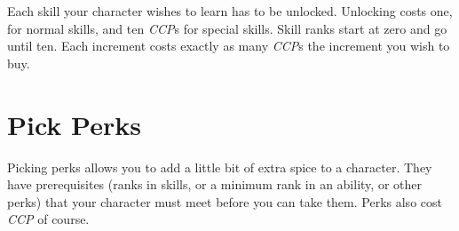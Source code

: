 Each skill your character wishes to learn has to be unlocked. Unlocking costs
one, for normal skills, and ten \emph{CCP}s for special skills. Skill ranks
start at zero and go until ten. Each increment costs exactly as many
\emph{CCP}s the increment you wish to buy.

\section{Pick Perks}
\label{sec:3-Pick Perks}

Picking perks allows you to add a little bit of extra spice to a character.
They have prerequisites (ranks in skills, or a minimum rank in an ability,
or other perks) that your character must meet before you can take them.
Perks also cost \emph{CCP} of course.
